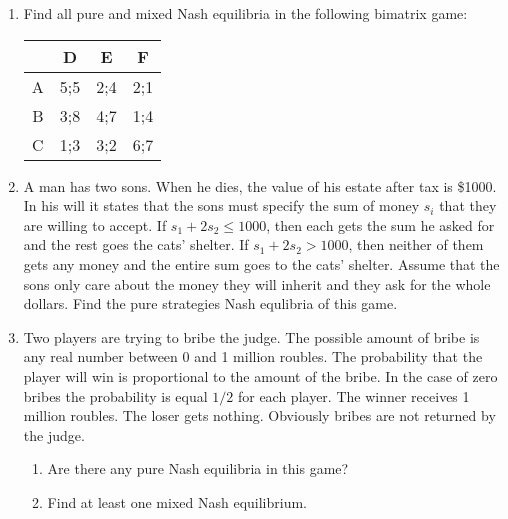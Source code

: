 \begin{enumerate}[resume]
\item Find all pure and mixed Nash equilibria in the following bimatrix game:


\begin{tabular}{c|ccc}
 & D & E & F \\
\hline
A & 5;5 & 2;4 & 2;1  \\
B & 3;8 & 4;7 & 1;4  \\
C & 1;3 & 3;2 & 6;7  \\
\end{tabular}
\item A man has two sons. When he dies, the value of his estate after tax is \$1000. In his will it states that the sons must specify the sum of money $s_i$ that they are willing to accept. If $s_1+2s_2\leq 1000$, then each gets the sum he asked for and the rest goes the cats’ shelter. If $s_1+2s_2> 1000$, then neither of them gets any money and the entire sum goes to the cats’ shelter. Assume that the sons only care about the money they will inherit and they ask for the whole dollars. Find the pure strategies Nash equlibria of this game.

\item Two players are trying to bribe the judge. The possible amount of bribe is any real number between 0 and 1 million roubles. The probability that the player will win is proportional to the amount of the bribe. In the case of zero bribes the probability is equal $1/2$ for each player. The winner receives 1 million roubles. The loser gets nothing. Obviously bribes are not returned by the judge.
\begin{enumerate}
\item Are there any pure Nash equilibria in this game?
\item Find at least one mixed Nash equilibrium.
\end{enumerate}

\end{enumerate}


